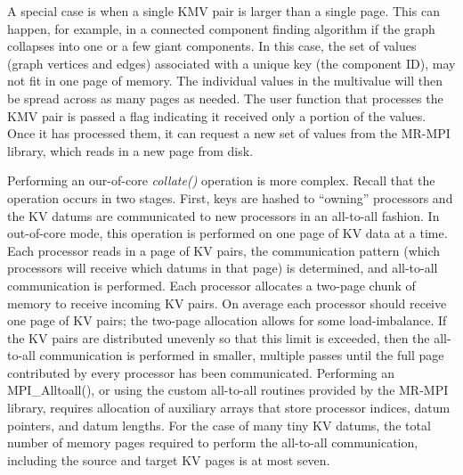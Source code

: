 A special case is when a single KMV pair is larger than a single page.
This can happen, for example, in a connected component finding
algorithm if the graph collapses into one or a few giant components.
In this case, the set of values (graph vertices and edges) associated
with a unique key (the component ID), may not fit in one page of
memory.  The individual values in the multivalue will then be spread
across as many pages as needed.  The user function that processes the
KMV pair is passed a flag indicating it received only a portion of the
values.  Once it has processed them, it can request a new set of
values from the MR-MPI library, which reads in a new page from disk.

Performing an our-of-core {\it collate()} operation is more complex.
Recall that the operation occurs in two stages.  First, keys are
hashed to ``owning'' processors and the KV datums are communicated to
new processors in an all-to-all fashion.  In out-of-core mode, this 
operation is
performed on one page of KV data at a time.  Each processor reads in a page of
KV pairs, the communication pattern (which processors will receive 
which datums in that page) is
determined, and all-to-all communication is
performed.  Each processor allocates a two-page chunk of memory to
receive incoming KV pairs.  On average each processor should receive
one page of KV pairs; the two-page allocation allows for some
load-imbalance.  If the KV pairs are distributed unevenly so that this
limit is exceeded, then the all-to-all communication is performed in
smaller, multiple passes until the full page contributed by every
processor has been communicated.  Performing an MPI\_Alltoall(), or
using the custom all-to-all routines provided by the MR-MPI library,
requires allocation of auxiliary arrays that store processor indices,
datum pointers, and datum lengths.  For the case of many tiny KV
datums, the total number of memory pages required to perform the
all-to-all communication, including the source and target KV pages is
at most seven.

